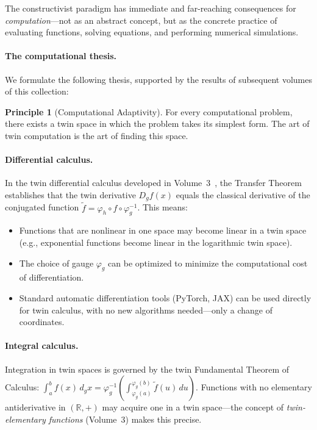 \documentclass[11pt,a4paper,openany]{book}
\theoremstyle{plain}
\theoremstyle{definition}
\newtheorem{principle}[theorem]{Principle}
\newcommand{\RR}{\mathbb{R}}
\begin{document}
The constructivist paradigm has immediate and far-reaching consequences for \emph{computation}---not as an abstract concept, but as the concrete practice of evaluating functions, solving equations, and performing numerical simulations.

\paragraph{The computational thesis.} We formulate the following thesis, supported by the results of subsequent volumes of this collection:

\begin{principle}[Computational Adaptivity]\label{prin:computational}
For every computational problem, there exists a twin space in which the problem takes its simplest form. The art of twin computation is the art of finding this space.
\end{principle}

\paragraph{Differential calculus.} In the twin differential calculus developed in Volume~3~\cite{Vol03}, the Transfer Theorem establishes that the twin derivative $D_g f(x)$ equals the classical derivative of the conjugated function $\tilde{f} = \varphi_h \circ f \circ \varphi_g^{-1}$. This means:
\begin{itemize}
\item Functions that are nonlinear in one space may become linear in a twin space (e.g., exponential functions become linear in the logarithmic twin space).
\item The choice of gauge $\varphi_g$ can be optimized to minimize the computational cost of differentiation.
\item Standard automatic differentiation tools (PyTorch, JAX) can be used directly for twin calculus, with no new algorithms needed---only a change of coordinates.
\end{itemize}

\paragraph{Integral calculus.} Integration in twin spaces is governed by the twin Fundamental Theorem of Calculus: $\int_a^b f(x) \, d_g x = \varphi_g^{-1}(\int_{\varphi_g(a)}^{\varphi_g(b)} \tilde{f}(u) \, du)$. Functions with no elementary antiderivative in $(\RR, +)$ may acquire one in a twin space---the concept of \emph{twin-elementary functions} (Volume~3) makes this precise.
\end{document}
